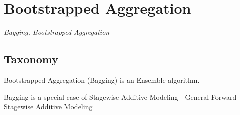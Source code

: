 
\section{Bootstrapped Aggregation} 
\label{sec:bagging}

\emph{Bagging, Bootstrapped Aggregation}

\subsection{Taxonomy}
Bootstrapped Aggregation (Bagging) is an Ensemble algorithm.

Bagging is a special case of Stagewise Additive Modeling - General Forward Stagewise Additive Modeling


